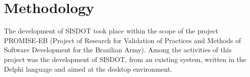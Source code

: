 \documentclass[twocolumn]{bmcart}%
\begin{document}









\section{Methodology}\label{sec:Methodology}


The development of SISDOT took place within the scope of the project PROMISE-EB (Project of Research for Validation of Practices and Methods of Software Development for the Brazilian Army). Among the activities of this project was the development of SISDOT, from an existing system, written in the Delphi language and aimed at the desktop environment.

\end{document}

